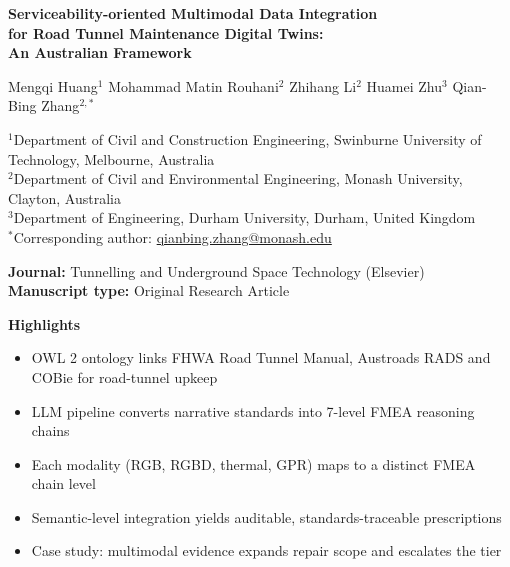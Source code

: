 \documentclass[11pt,a4paper]{article}
\begin{document}
\begin{titlepage}
\centering
\vspace*{0.8cm}
{\LARGE\bfseries Serviceability-oriented Multimodal Data Integration\\[6pt]
for Road Tunnel Maintenance Digital Twins:\\[6pt]
An Australian Framework\par}

\vspace{1.2cm}
{\large
Mengqi Huang$^{1}$ \quad
Mohammad Matin Rouhani$^{2}$ \quad
Zhihang Li$^{2}$ \quad
Huamei Zhu$^{3}$ \quad
Qian-Bing Zhang$^{2,*}$\par}

\vspace{0.7cm}
{\normalsize
$^{1}$Department of Civil and Construction Engineering,
   Swinburne University of Technology, Melbourne, Australia\\[2pt]
$^{2}$Department of Civil and Environmental Engineering,
   Monash University, Clayton, Australia\\[6pt]
$^{3}$Department of Engineering, Durham University, Durham, United Kingdom\\[6pt]
$^{*}$Corresponding author:
   \href{mailto:qianbing.zhang@monash.edu}{qianbing.zhang@monash.edu}\par}

\vspace{1.5cm}
\textbf{Journal:} Tunnelling and Underground Space Technology (Elsevier)\\[3pt]
\textbf{Manuscript type:} Original Research Article

\vspace{1.2cm}
\noindent\textbf{Highlights}
\begin{itemize}[leftmargin=4em]
  \item OWL 2 ontology links FHWA Road Tunnel Manual, Austroads RADS and COBie for road-tunnel upkeep
  \item LLM pipeline converts narrative standards into 7-level FMEA reasoning chains
  \item Each modality (RGB, RGBD, thermal, GPR) maps to a distinct FMEA chain level
  \item Semantic-level integration yields auditable, standards-traceable prescriptions
  \item Case study: multimodal evidence expands repair scope and escalates the tier 
\end{itemize}
\end{titlepage}
\end{document}

